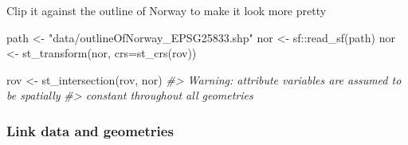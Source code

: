 \documentclass[
]{book}
\newenvironment{Shaded}{\begin{snugshade}}{\end{snugshade}}
\newcommand{\AttributeTok}[1]{\textcolor[rgb]{0.77,0.63,0.00}{#1}}
\newcommand{\CommentTok}[1]{\textcolor[rgb]{0.56,0.35,0.01}{\textit{#1}}}
\newcommand{\FunctionTok}[1]{\textcolor[rgb]{0.00,0.00,0.00}{#1}}
\newcommand{\NormalTok}[1]{#1}
\newcommand{\OtherTok}[1]{\textcolor[rgb]{0.56,0.35,0.01}{#1}}
\newcommand{\SpecialCharTok}[1]{\textcolor[rgb]{0.00,0.00,0.00}{#1}}
\newcommand{\StringTok}[1]{\textcolor[rgb]{0.31,0.60,0.02}{#1}}
\begin{document}
Clip it against the outline of Norway to make it look more pretty

\begin{Shaded}
\begin{Highlighting}[]
\NormalTok{path }\OtherTok{\textless{}{-}} \StringTok{"data/outlineOfNorway\_EPSG25833.shp"}
\NormalTok{nor }\OtherTok{\textless{}{-}}\NormalTok{ sf}\SpecialCharTok{::}\FunctionTok{read\_sf}\NormalTok{(path)}
\NormalTok{nor }\OtherTok{\textless{}{-}} \FunctionTok{st\_transform}\NormalTok{(nor, }\AttributeTok{crs=}\FunctionTok{st\_crs}\NormalTok{(rov))}
\end{Highlighting}
\end{Shaded}

\begin{Shaded}
\begin{Highlighting}[]
\NormalTok{rov }\OtherTok{\textless{}{-}} \FunctionTok{st\_intersection}\NormalTok{(rov, nor)}
\CommentTok{\#\textgreater{} Warning: attribute variables are assumed to be spatially}
\CommentTok{\#\textgreater{} constant throughout all geometries}
\end{Highlighting}
\end{Shaded}

\hypertarget{link-data-and-geometries}{%
\subsubsection{Link data and geometries}\label{link-data-and-geometries}}

\begin{Shaded}
\end{Shaded}
\end{document}
